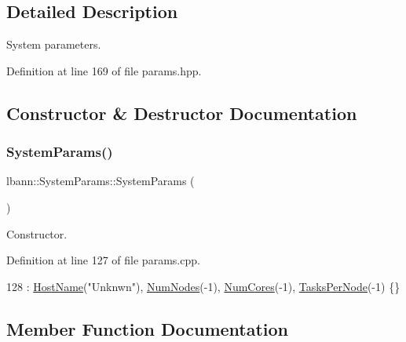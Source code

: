 \subsection{Detailed Description}
System parameters. 

Definition at line 169 of file params.\+hpp.



\subsection{Constructor \& Destructor Documentation}
\mbox{\label{classlbann_1_1SystemParams_a74bc72829591193eef9a59d0d53f782f}} 
\subsubsection{\texorpdfstring{System\+Params()}{SystemParams()}}
{\footnotesize\ttfamily lbann\+::\+System\+Params\+::\+System\+Params (\begin{DoxyParamCaption}{ }\end{DoxyParamCaption})}



Constructor. 



Definition at line 127 of file params.\+cpp.


\begin{DoxyCode}
128   : \hyperlink{classlbann_1_1SystemParams_a4aa517715ee0a454ee7ca2cc23fe30ee}{HostName}(\textcolor{stringliteral}{"Unknwn"}), \hyperlink{classlbann_1_1SystemParams_ad63e9fea31313d45d13298e35b47982a}{NumNodes}(-1), \hyperlink{classlbann_1_1SystemParams_aa4f76625da59edc74b6d9208cb60a3db}{NumCores}(-1), 
      \hyperlink{classlbann_1_1SystemParams_a93758103d73bcd95146f99464203aa86}{TasksPerNode}(-1) \{\}
\end{DoxyCode}


\subsection{Member Function Documentation}
\mbox{\label{classlbann_1_1SystemParams_a730176df36a262f7ef141afda372488d}} 
